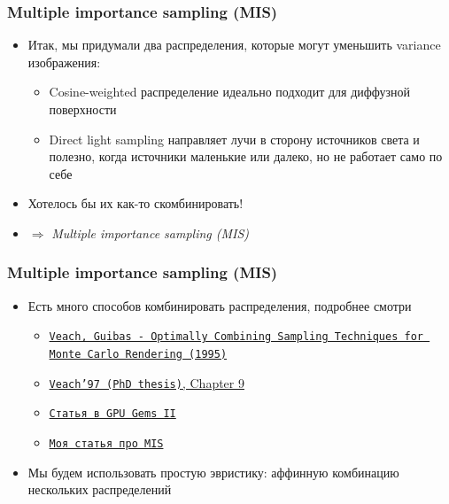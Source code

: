 \documentclass[10pt]{beamer}
\begin{document}
\begin{frame}
\frametitle{Multiple importance sampling (MIS)}
\begin{itemize}
\item Итак, мы придумали два распределения, которые могут уменьшить variance изображения:
\pause
\begin{itemize}
\item Cosine-weighted распределение идеально подходит для диффузной поверхности
\pause
\item Direct light sampling направляет лучи в сторону источников света и полезно, когда источники маленькие или далеко, но не работает само по себе
\end{itemize}
\pause
\item Хотелось бы их как-то скомбинировать!
\pause
\item \begin{math}\Longrightarrow\end{math} \textit{Multiple importance sampling (MIS)}
\end{itemize}
\end{frame}

\begin{frame}
\frametitle{Multiple importance sampling (MIS)}
\begin{itemize}
\item Есть много способов комбинировать распределения, подробнее смотри
\begin{itemize}
\item \href{https://cseweb.ucsd.edu/~viscomp/classes/cse168/sp21/readings/veach.pdf}{\texttt{Veach, Guibas - Optimally Combining Sampling Techniques for Monte Carlo Rendering (1995)}}
\item \href{https://graphics.stanford.edu/papers/veach_thesis/thesis.pdf}{\texttt{Veach'97 (PhD thesis)}, Chapter 9}
\item \href{https://link.springer.com/chapter/10.1007/978-1-4842-7185-8_20}{\texttt{Статья в GPU Gems II}}
\item \href{https://lisyarus.github.io/blog/posts/multiple-importance-sampling.html}{\texttt{Моя статья про MIS}}
\end{itemize}
\pause
\item Мы будем использовать простую эвристику: аффинную комбинацию нескольких распределений
\end{itemize}
\end{frame}
\end{document}
